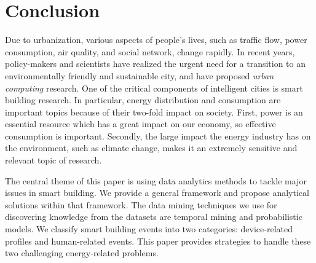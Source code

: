 \section{Conclusion}
Due to urbanization, various aspects of people's lives, such as traffic flow, power consumption, air quality, and social network, change rapidly. In recent years, policy-makers and scientists have realized the urgent need for a transition to an environmentally friendly and sustainable city, and have proposed \emph{urban computing} research. One of the critical components of intelligent cities is smart building research. In particular, energy distribution and consumption are important topics because of their two-fold impact on society. First, power is an essential resource which has a great impact on our economy, so effective consumption is important. Secondly, the large impact the energy industry has on the environment, such as climate change, makes it an extremely sensitive and relevant topic of research. 

The central theme of this paper is using data analytics methods to tackle major issues in smart building. We provide a general framework and propose analytical solutions within that framework. The data mining techniques we use for discovering knowledge from the datasets are temporal mining and probabilistic models. We classify smart building events into two categories: device-related profiles and human-related events. This paper provides strategies to handle these two challenging energy-related problems. 

